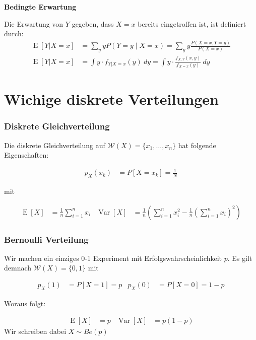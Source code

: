 \documentclass[25pt]{sciposter}
\newcommand{\W}{\mathcal{W}}
\newcommand{\Var}{\operatorname{Var}}
\newcommand{\E}{\operatorname{E}}
\newenvironment{method}[1]{\begin{mdframed}[backgroundcolor=blue!10,innertopmargin=15pt, innerbottommargin=15pt,nobreak=true]
		\textbf{#1 }
	}
	{ 
	\end{mdframed}
}
\begin{document}
\begin{multicols}{3}
		
		\begin{method}{Bedingte Erwartung}
			Die Erwartung von $Y$ gegeben, dass $X=x$ bereits eingetroffen ist, ist definiert durch:
			\begin{align*}
				\E[Y|X=x] &= \sum _{y}yP(Y=y\mid X=x)=\sum _{y}y{\frac {P(X=x,Y=y)}{P(X=x)}}\\
				\E[Y|X=x] &= \int y\cdot  f_{Y|X=x}(y)\  dy = \int y\cdot  \frac{f_{X,Y}(x,y)}{f_{X=x}(y)} \ dy
			\end{align*}
		\end{method}
		
		
		
		\section{Wichige diskrete Verteilungen}
		
		\subsubsection*{Diskrete Gleichverteilung}
		Die diskrete Gleichverteilung auf  $\W(X)=\{x_1,\ldots,x_n\}$ hat folgende Eigenschaften:
		
		\begin{align*}
			p_X(x_k) &= P[X = x_k] = \frac{1}{N}
		\end{align*}
		
		mit 
		
		\begin{align*}
			\operatorname {E}[X]&={\frac  {1}{n}}\sum _{{i=1}}^{n}x_{i} & \operatorname {Var}[X]&={\frac  {1}{n}}\left(\sum _{{i=1}}^{n}x_{i}^{2}-{\frac  {1}{n}}\left(\sum _{{i=1}}^{n}x_{i}\right)^{2}\right)
		\end{align*}
		
		\subsubsection*{Bernoulli Verteilung}
		Wir machen ein einziges 0-1 Experiment mit Erfolgswahrscheinlichkeit $p$. Es gilt demnach $\W(X) = \{0,1\}$ mit 
		
		\begin{align*}
			p_X(1) &= P[X=1] = p & 	p_X(0) &= P[X=0] = 1-p
		\end{align*}
		
		Woraus folgt:
		
		\begin{align*}
			\E[X] &= p & \Var[X] &= p(1-p)
		\end{align*}
		Wir schreiben dabei $X\sim {Be}(p)$
		

\end{multicols}
\end{document}
